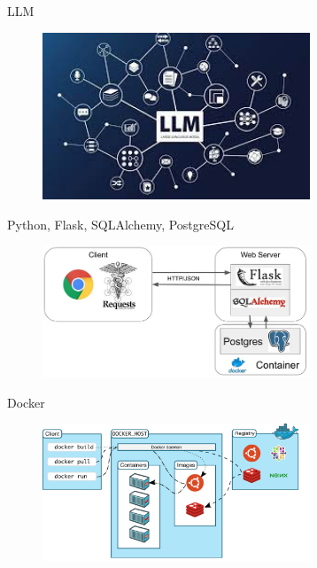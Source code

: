 \documentclass[aspectratio=169,xcolor=dvipsnames, t]{beamer}
\begin{document}
\begin{frame}{LLM}
\begin{figure}
\includegraphics[width=8cm]{style_data/img/llm.jpg}
\centering
\end{figure}
\end{frame}

\begin{frame}{Python, Flask, SQLAlchemy, PostgreSQL}
\begin{figure}
\includegraphics[width=8cm]{style_data/img/python_flask.png}
\centering
\end{figure}
\end{frame}

\begin{frame}{Docker}
\begin{figure}
\includegraphics[width=8cm]{style_data/img/ArquiteturaDocker.png}
\centering
\end{figure}
\end{frame}

\end{document}

